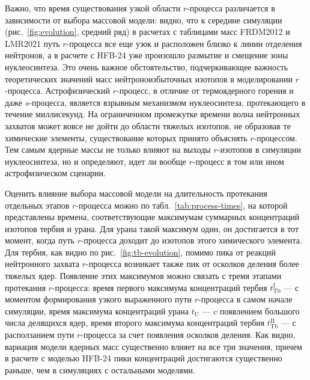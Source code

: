 Важно, что время существования узкой области $r$-процесса различается в зависимости от выбора массовой модели: видно, что к середине симуляции (рис.~\ref{fig:evolution}, средний ряд) в расчетах с таблицами масс FRDM2012 и LMR2021 путь $r$-процесса все еще узок и расположен близко к линии отделения нейтронов, а в расчете с HFB-24 уже произошло размытие и смещение зоны нуклеосинтеза. Это очень важное обстоятельство, подчеркивающее важность теоретических значений масс нейтроноизбыточных изотопов в моделировании $r$-процесса. Астрофизический $r$-процесс, в отличие от термоядерного горения и даже $s$-процесса, является взрывным механизмом нуклеосинтеза, протекающего в течение миллисекунд. На ограниченном промежутке времени волна нейтронных захватов может вовсе не дойти до области тяжелых изотопов, не образовав те химические элементы, существование которых принято объяснять $r$-процессом. Тем самым ядерные массы не только влияют на выходы $r$-изотопов в симуляции нуклеосинтеза, но и определяют, идет ли вообще $r$-процесс в том или ином астрофизическом сценарии.

Оценить влияние выбора массовой модели на длительность протекания отдельных этапов $r$-процесса можно по табл.~\ref{tab:process-times}, на которой представлены времена, соответствующие максимумам суммарных концентраций изотопов тербия и урана. Для урана такой максимум один, он достигается в тот момент, когда путь $r$-процесса доходит до изотопов этого химического элемента. Для тербия, как видно по рис.~\ref{fig:tb-evolution}, помимо пика от реакций нейтронного захвата $r$-процесса возникает также пик от осколков деления более тяжелых ядер. Появление этих максимумов можно связать с тремя этапами протекания $r$-процесса: время первого максимума концентраций тербия $t^\text{I}_\text{Tb}$ --- с моментом формирования узкого выраженного пути $r$-процесса в самом начале симуляции, время максимума концентраций урана $t_\text{U}$ --- c появлением большого числа делящихся ядер, время второго максимума концентраций тербия $t^\text{II}_\text{Tb}$ --- с расползанием пути $r$-процесса за счет появления осколков деления. Как видно, вариация модели ядерных масс существенно влияет на все три значения, причем в расчете с моделью HFB-24 пики концентраций достигаются существенно раньше, чем в симуляциях с остальными моделями.  

